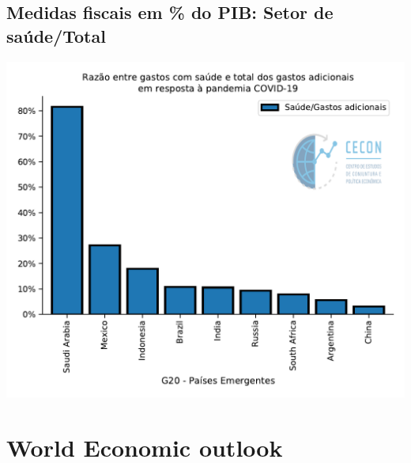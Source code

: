 \documentclass{SelfArx}
\begin{document}
\subsection*{Medidas fiscais em \% do PIB: Setor de saúde/Total}
\label{sec:org9b4b182}

\begin{center}
\includegraphics[width=.9\linewidth]{./figs/IMF/FiscalMonitor_Covid_total.pdf}
\end{center}

\section*{World Economic outlook}
\label{sec:org591dacf}
\end{document}
